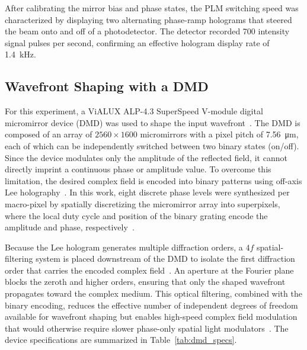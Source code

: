 \documentclass[11pt, twoside]{article}
\begin{document}
After calibrating the mirror bias and phase states, the PLM switching speed was characterized by displaying two alternating phase-ramp holograms that steered the beam onto and off of a photodetector. The detector recorded 700 intensity signal pulses per second, confirming an effective hologram display rate of \SI{1.4}{\kilo\hertz}.


\subsection{Wavefront Shaping with a DMD}
\label{subsec:dmd}

For this experiment, a ViALUX ALP-4.3 SuperSpeed V-module digital micromirror device (DMD) was used to shape the input wavefront~\cite{vialux2023alp}. The DMD is composed of an array of $2560 \times 1600$ micromirrors with a pixel pitch of \SI{7.56}{\micro\meter}, each of which can be independently switched between two binary states (on/off). Since the device modulates only the amplitude of the reflected field, it cannot directly imprint a continuous phase or amplitude value. To overcome this limitation, the desired complex field is encoded into binary patterns using off-axis Lee holography~\cite{gutierrezcuevas2024binary}. In this work, eight discrete phase levels were synthesized per macro-pixel by spatially discretizing the micromirror array into superpixels, where the local duty cycle and position of the binary grating encode the amplitude and phase, respectively~\cite{gutierrezcuevas2024binary}.

Because the Lee hologram generates multiple diffraction orders, a $4f$ spatial-filtering system is placed downstream of the DMD to isolate the first diffraction order that carries the encoded complex field~\cite{gutierrezcuevas2024binary}. An aperture at the Fourier plane blocks the zeroth and higher orders, ensuring that only the shaped wavefront propagates toward the complex medium. This optical filtering, combined with the binary encoding, reduces the effective number of independent degrees of freedom available for wavefront shaping but enables high-speed complex field modulation that would otherwise require slower phase-only spatial light modulators~\cite{mosk2012controlling, gigan2022roadmap}. The device specifications are summarized in Table~\ref{tab:dmd_specs}.
\end{document}
